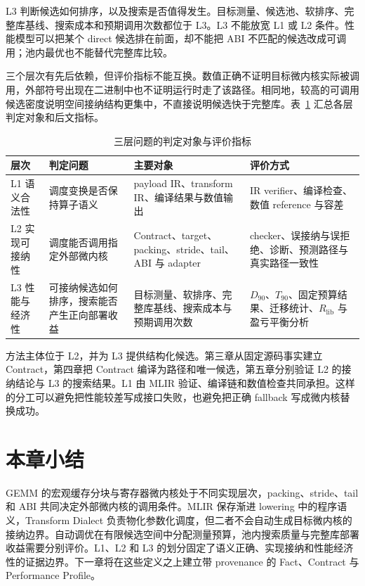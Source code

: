 L3 判断候选如何排序，以及搜索是否值得发生。目标测量、候选池、软排序、完整库基线、搜索成本和预期调用次数都位于 L3。L3 不能放宽 L1 或 L2 条件。性能模型可以把某个 direct 候选排在前面，却不能把 ABI 不匹配的候选改成可调用；池内最优也不能替代完整库比较。

三个层次有先后依赖，但评价指标不能互换。数值正确不证明目标微内核实际被调用，外部符号出现在二进制中也不证明运行时走了该路径。相同地，较高的可调用候选密度说明空间接纳结构更集中，不直接说明候选快于完整库。表~\ref{tab:chapter2-three-layer-evaluation} 汇总各层判定对象和后文指标。

\begin{table}[!htbp]
  \centering
  \caption{三层问题的判定对象与评价指标}
  \label{tab:chapter2-three-layer-evaluation}
  \begingroup
  \begin{tabularx}{\textwidth}{
    @{}
    >{\centering\arraybackslash}p{}
    >{\raggedright\arraybackslash}p{}
    >{\raggedright\arraybackslash}X
    >{\raggedright\arraybackslash}p{}
    @{}
  }
    \toprule
    \textbf{层次} & \textbf{判定问题} & \textbf{主要对象} & \textbf{评价方式} \\
    \midrule
    L1 语义合法性
      & 调度变换是否保持算子语义
      & payload IR、transform IR、编译结果与数值输出
      & IR verifier、编译检查、数值 reference 与容差 \\
    L2 实现可接纳性
      & 调度能否调用指定外部微内核
      & Contract、target、packing、stride、tail、ABI 与 adapter
      & checker、误接纳与误拒绝、诊断、预测路径与真实路径一致性 \\
    L3 性能与经济性
      & 可接纳候选如何排序，搜索能否产生正向部署收益
      & 目标测量、软排序、完整库基线、搜索成本与预期调用次数
      & $D_{90}$、$T_{90}$、固定预算结果、迁移统计、$R_{\mathrm{lib}}$ 与盈亏平衡分析 \\
    \bottomrule
  \end{tabularx}
  \endgroup
\end{table}

方法主体位于 L2，并为 L3 提供结构化候选。第三章从固定源码事实建立 Contract，第四章把 Contract 编译为路径和唯一候选，第五章分别验证 L2 的接纳结论与 L3 的搜索结果。L1 由 MLIR 验证、编译链和数值检查共同承担。这样的分工可以避免把性能较差写成接口失败，也避免把正确 fallback 写成微内核替换成功。

\section{本章小结}

GEMM 的宏观缓存分块与寄存器微内核处于不同实现层次，packing、stride、tail 和 ABI 共同决定外部微内核的调用条件。MLIR 保存渐进 lowering 中的程序语义，Transform Dialect 负责物化参数化调度，但二者不会自动生成目标微内核的接纳边界。自动调优在有限候选空间中分配测量预算，池内搜索质量与完整库部署收益需要分别评价。L1、L2 和 L3 的划分固定了语义正确、实现接纳和性能经济性的证据边界。下一章将在这些定义之上建立带 provenance 的 Fact、Contract 与 Performance Profile。
